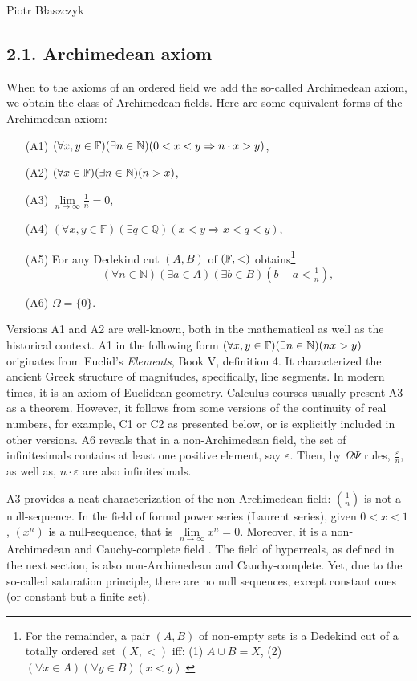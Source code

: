 \begin{artengenv}{Piotr Błaszczyk}
\subsection{2.1. Archimedean axiom}
When to the axioms of an ordered field we add the so-called Archimedean axiom, we obtain the class of
Archimedean fields.
Here are some equivalent forms of the Archimedean axiom:
\begin{enumerate}\itemsep 0mm
  \item [(A1)] $(\forall x,y\in {\mathbb{F}})(\exists n\in{\mathbb{N}})(0<x<y\Rightarrow n\cdot x>y)$,
  \item [(A2)] $(\forall x\in\mathbb F)(\exists n\in{\mathbb{N}})(n>x) $,
  \item [(A3)] $\lim\limits_{n\to \infty} \frac 1n=0$,
  \item [(A4)] $(\forall x,y\in\mathbb F)(\exists q\in\mathbb Q)( x<y\Rightarrow x<q<y),$
\item [(A5)] For any Dedekind cut  $(A,B)$ of $({\mathbb{F}},<)$ obtains\footnote{For the remainder, a pair $(A,B)$
 of non-empty sets is a Dedekind cut of a totally ordered set $(X,<)$ iff: (1) $A\cup B=X$, %
 (2) $(\forall x\in A)(\forall y\in B)(x<y)$.}
$$(\forall n\in\mathbb{N})(\exists a\in A)(\exists b\in B)(b-a<\tfrac 1n),$$
\item[(A6)] $\Omega=\{0\}$.
\end{enumerate}



Versions A1 and A2 are well-known,  both in the mathematical as well as the historical context. A1 in the following form $(\forall x,y\in {\mathbb{F}})(\exists n\in{\mathbb{N}})(nx>y)$ originates from Euclid's \textit{Elements}, Book V, definition 4. It characterized the ancient Greek structure of magnitudes, specifically, line segments. In modern times, it is an axiom of Euclidean geometry.  Calculus courses usually present A3 as a theorem. However, it  follows from some versions of the continuity of real numbers, for example, C1 or C2 as presented below, 
or is explicitly included in other versions.
  A6 reveals that in a non-Archimedean field, the set of infinitesimals contains at least one positive element, say $\varepsilon$.
     Then, by $\Omega\Psi$ rules, $\tfrac \varepsilon n$, as well as, $n\cdot\varepsilon$   are also infinitesimals.

A3 provides a neat characterization of the non-Archimedean field: $(\frac 1n)$ is not a null-sequence.
In the field of formal power series (Laurent series), given $0<x<1$, $(x^n)$ is a null-sequence, that is $\lim\limits_{n\to \infty}x^n=0$. Moreover, it is a non-Archimedean and Cauchy-complete field \parencites[see][70]{ref_ce}[or][269--272]{ref_pb07}. The field of hyperreals, as defined in the next section, is also non-Archimedean and Cauchy-complete. Yet, due to the so-called saturation principle, there are no null sequences, except constant ones (or constant but a finite set).  


\end{artengenv}

